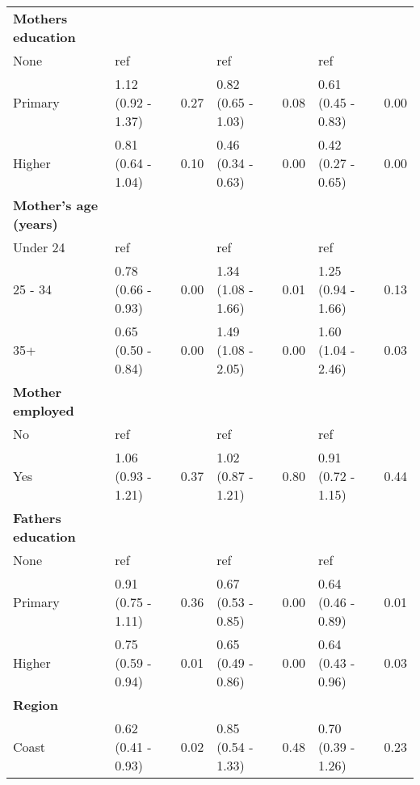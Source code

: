 \documentclass[sn-basic,Numbered,pdflatex]{sn-jnl}
\theoremstyle{remark}
\theoremstyle{definition}
\begin{document}
\begin{table}[!h]
\begin{tabular}[t]{lllllll}
\textbf{Mothers education} & \textbf{} & \textbf{} & \textbf{} & \textbf{} & \textbf{} & \textbf{}\\
\hspace{1em}None & ref &  & ref &  & ref \vphantom{1} & \\
\hspace{1em}Primary & 1.12 (0.92 - 1.37) & 0.27 & 0.82 (0.65 - 1.03) & 0.08 & 0.61 (0.45 - 0.83) & 0.00\\
\addlinespace
\hspace{1em}Higher & 0.81 (0.64 - 1.04) & 0.10 & 0.46 (0.34 - 0.63) & 0.00 & 0.42 (0.27 - 0.65) & 0.00\\
\textbf{Mother's age (years)} & \textbf{} & \textbf{} & \textbf{} & \textbf{} & \textbf{} & \textbf{}\\
\hspace{1em}Under 24 & ref &  & ref &  & ref & \\
\hspace{1em}25 - 34 & 0.78 (0.66 - 0.93) & 0.00 & 1.34 (1.08 - 1.66) & 0.01 & 1.25 (0.94 - 1.66) & 0.13\\
\hspace{1em}35+ & 0.65 (0.50 - 0.84) & 0.00 & 1.49 (1.08 - 2.05) & 0.00 & 1.60 (1.04 - 2.46) & 0.03\\
\addlinespace
\textbf{Mother employed} & \textbf{} & \textbf{} & \textbf{} & \textbf{} & \textbf{} & \textbf{}\\
\hspace{1em}No & ref &  & ref &  & ref & \\
\hspace{1em}Yes & 1.06 (0.93 - 1.21) & 0.37 & 1.02 (0.87 - 1.21) & 0.80 & 0.91 (0.72 - 1.15) & 0.44\\
\textbf{Fathers education} & \textbf{} & \textbf{} & \textbf{} & \textbf{} & \textbf{} & \textbf{}\\
\hspace{1em}None & ref &  & ref &  & ref & \\
\addlinespace
\hspace{1em}Primary & 0.91 (0.75 - 1.11) & 0.36 & 0.67 (0.53 - 0.85) & 0.00 & 0.64 (0.46 - 0.89) & 0.01\\
\hspace{1em}Higher & 0.75 (0.59 - 0.94) & 0.01 & 0.65 (0.49 - 0.86) & 0.00 & 0.64 (0.43 - 0.96) & 0.03\\
\textbf{Region} & \textbf{} & \textbf{} & \textbf{} & \textbf{} & \textbf{} & \textbf{}\\
\hspace{1em}Coast & 0.62 (0.41 - 0.93) & 0.02 & 0.85 (0.54 - 1.33) & 0.48 & 0.70 (0.39 - 1.26) & 0.23\\

\end{tabular}
\end{table}
\end{document}

